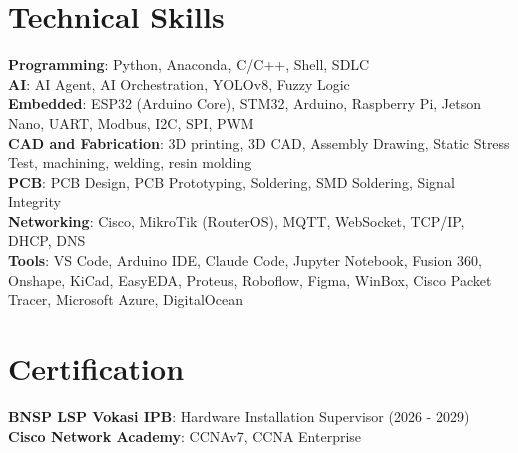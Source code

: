 \documentclass[letterpaper,11pt]{article}
\begin{document}
\section{Technical Skills}
 \begin{itemize}[leftmargin=0.15in, label={}]
    \small{\item{
     \textbf{Programming}{: Python, Anaconda, C/C++, Shell, SDLC} \\
     \textbf{AI}{: AI Agent, AI Orchestration, YOLOv8, Fuzzy Logic} \\
     \textbf{Embedded}{: ESP32 (Arduino Core), STM32, Arduino, Raspberry Pi, Jetson Nano, UART, Modbus, I2C, SPI, PWM} \\
     \textbf{CAD and Fabrication}{: 3D printing, 3D CAD, Assembly Drawing, Static Stress Test, machining, welding, resin molding} \\
     \textbf{PCB}{: PCB Design, PCB Prototyping, Soldering, SMD Soldering, Signal Integrity} \\
     \textbf{Networking}{: Cisco, MikroTik (RouterOS), MQTT, WebSocket, TCP/IP, DHCP, DNS} \\
     \textbf{Tools}{: VS Code, Arduino IDE, Claude Code, Jupyter Notebook, Fusion 360, Onshape, KiCad, EasyEDA, Proteus, Roboflow, Figma, WinBox, Cisco Packet Tracer, Microsoft Azure, DigitalOcean}
    }}
 \end{itemize}

\section{Certification}
 \begin{itemize}[leftmargin=0.15in, label={}]
    \small{\item{
     \textbf{BNSP LSP Vokasi IPB}{: Hardware Installation Supervisor (2026 - 2029)} \\
     \textbf{Cisco Network Academy}{: CCNAv7, CCNA Enterprise} \\
    }}
 \end{itemize}
\end{document}
